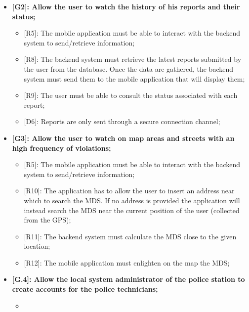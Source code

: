 \begin{itemize}
\begin{itemize}
    \end{itemize}
  \item \textbf{{[G2]}: Allow the user to watch the history of his reports and their status;}
    \begin{itemize}
      \item {[R5]}: The mobile application must be able to interact with the backend system to send/retrieve information;
      \item {[R8]}: The backend system must retrieve the latest reports submitted by the user from the database. Once the data are gathered, the backend system must send them to the mobile application that will display them;
      \item {[R9]}: The user must be able to consult the status associated with each report;
      \item {[D6]}: Reports are only sent through a secure connection channel;
    \end{itemize}
  \item \textbf{{[G3]}: Allow the user to watch on map areas and streets with an high frequency of violations;}
    \begin{itemize}
      \item {[R5]}: The mobile application must be able to interact with the backend system to send/retrieve information;
      \item {[R10]}: The application has to allow the user to insert an address near which to search the MDS. If no address is provided the application will instead search the MDS near the current position of the user (collected from the GPS);
      \item {[R11]}: The backend system must calculate the MDS close to the given location;
      \item {[R12]}: The mobile application must enlighten on the map the MDS;
    \end{itemize}
  \item \textbf{{[G.4]}: Allow the local system administrator of the police station to create accounts for the police technicians;}
    \begin{itemize}
      \item 
    \end{itemize}
\end{itemize}
